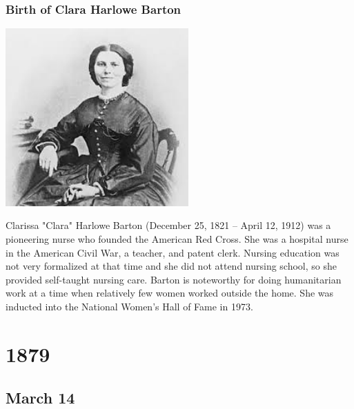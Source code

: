 \documentclass[11pt]{report}
\begin{document}
\subsection{Birth of Clara Harlowe Barton}
\vspace{2mm}\begin{center}\includegraphics[width=7cm]{./img/claraBarton.jpg}\end{center}
Clarissa "Clara" Harlowe Barton (December 25, 1821 – April 12, 1912) was a pioneering nurse who founded the American Red Cross. She was a hospital nurse in the American Civil War, a teacher, and patent clerk. Nursing education was not very formalized at that time and she did not attend nursing school, so she provided self-taught nursing care. Barton is noteworthy for doing humanitarian work at a time when relatively few women worked outside the home. She was inducted into the National Women's Hall of Fame in 1973.

\chapter{1879}
\section{March 14}
\end{document}
